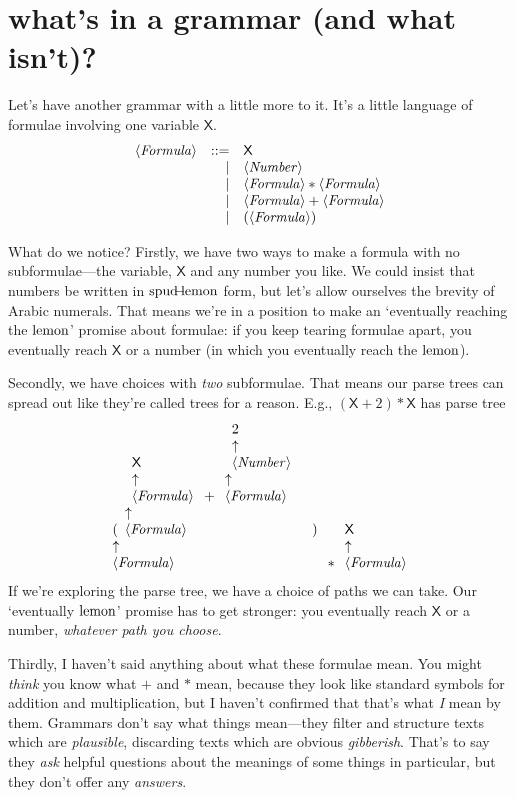 \documentclass{book}
\begin{document}
\section{what's in a grammar (and what isn't)?}

\newcommand{\X}{\mathsf{X}}
\newcommand{\SB}{\mathsf{SumBelow}\;}
\newcommand{\SH}{\mathsf{Shift}\;}
Let's have another grammar with a little more to it. It's a little language of formulae involving one variable $\X$.
\[\begin{array}{rrl}
\nt{Formula}
& ::= & \X \\
&   | & \nt{Number} \\
&   | & \nt{Formula} * \nt{Formula} \\
&   | & \nt{Formula} + \nt{Formula} \\
&   | & (\nt{Formula})
\end{array}\]

What do we notice? Firstly, we have two ways to make a formula with no subformulae---the variable, $\X$ and any number you like. We could insist that numbers be written in $\mbox{spud}\!\!\!-\!\!\!\mbox{lemon}$ form, but let's allow ourselves the brevity of Arabic numerals. That means we're in a position to make an `eventually reaching the $\mbox{lemon}$' promise about formulae: if you keep tearing formulae apart, you eventually reach $\X$ or a number (in which you eventually reach the $\mbox{lemon}$).

Secondly, we have choices with \emph{two} subformulae. That means our parse trees can spread out like they're called trees for a reason. E.g., $(\X + 2)*\X$ has parse tree
\[
\nta{Formula}{(\nta{Formula}{\nta{Formula}{\X} + \nta{Formula}{\nta{Number}{2}}})}
*
\nta{Formula}{\X}
\]
If we're exploring the parse tree, we have a choice of paths we can take. Our `eventually $\mbox{lemon}$' promise has to get stronger: you eventually reach $\X$ or a number, \emph{whatever path you choose}.

Thirdly, I haven't said anything about what these formulae mean. You might \emph{think} you know what $+$ and $*$ mean, because they look like standard symbols for addition and multiplication, but I haven't confirmed that that's what \emph{I} mean by them. Grammars don't say what things mean---they filter and structure texts which are \emph{plausible}, discarding texts which are obvious \emph{gibberish}. That's to say they \emph{ask} helpful questions about the meanings of some things in particular, but they don't offer any \emph{answers}.
\end{document}
